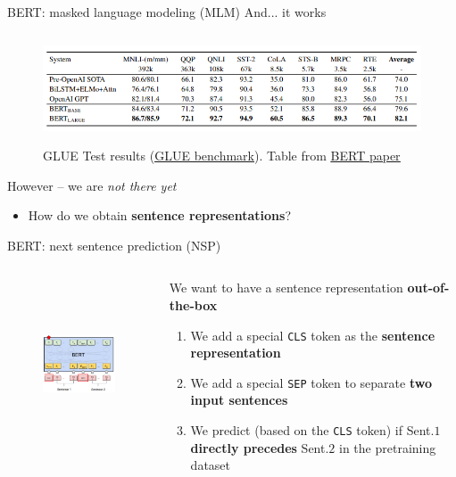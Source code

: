 \documentclass[12pt,aspectratio=169,handout]{beamer}
\begin{document}
\begin{frame}{BERT: masked language modeling (MLM)}
	And... it works

	\begin{figure}[h]
		\includegraphics[height=3.25cm]{bert-results}
		\caption*{GLUE Test results (\href{https://gluebenchmark.com/leaderboard}{\underline{GLUE benchmark}}). Table from \href{https://arxiv.org/pdf/1810.04805.pdf}{\underline{BERT paper}}}
	\end{figure}
	\pause
	However -- we are \textit{not there yet}
	\pause
	\begin{itemize}
		\item How do we obtain \textbf{sentence representations}?
	\end{itemize}

\end{frame}

\begin{frame}[fragile]{BERT: next sentence prediction (NSP)}

	\begin{columns}[T] %
		\begin{column}{.48\textwidth}
		\begin{figure}[h]
			\includegraphics[height=5cm]{bert_nsp_anno.png}
		\end{figure}
		\end{column}
	
		\begin{column}{.48\textwidth}
			We want to have a sentence representation \textbf{out-of-the-box}
			\pause
			\begin{enumerate}
				\item We add a special \verb|CLS| token as the \textbf{sentence representation}
				\item We add a special \verb|SEP| token to separate \textbf{two input sentences}
				\pause
				\item We predict (based on the \verb|CLS| token) if Sent.$1$ \textbf{directly precedes} Sent.$2$ in the pretraining dataset 
			\end{enumerate}

		\end{column}
	\end{columns}
\end{frame}
\end{document}
